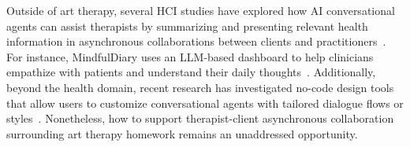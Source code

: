 
Outside of art therapy, several HCI studies have explored how AI conversational agents can assist therapists by summarizing and presenting relevant health information in asynchronous collaborations between clients and practitioners~\cite{kim2024mindfuldiary, yang2024talk2care,10.1145/3659604}. 
For instance, MindfulDiary uses an LLM-based dashboard to help clinicians empathize with patients and understand their daily thoughts~\cite{kim2024mindfuldiary}. 
Additionally, beyond the health domain, recent research has investigated no-code design tools that allow users to customize conversational agents with tailored dialogue flows or styles~\cite{hedderich2024piece, ha2024clochat}. 
Nonetheless, how to support therapist-client asynchronous collaboration surrounding art therapy homework remains an unaddressed opportunity.



